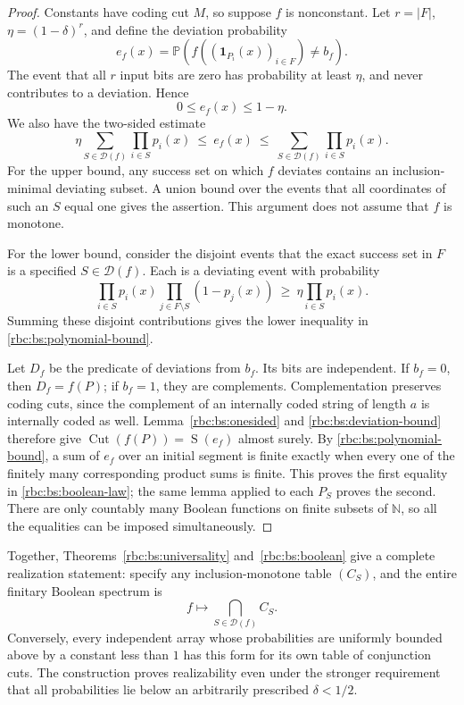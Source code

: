 \documentclass[11pt]{article}
\numberwithin{equation}{section}
\theoremstyle{definition}
\theoremstyle{remark}
\newcommand{\N}{\mathbb N}
\newcommand{\Cut}{\operatorname{Cut}}
\newcommand{\SumCut}{\operatorname{S}}
\newcommand{\Prob}{\mathbb P}
\begin{document}
\begin{proof}
Constants have coding cut $M$, so suppose $f$ is nonconstant.
Let $r=|F|$, $\eta=(1-\delta)^r$, and define the deviation probability
\[
  e_f(x)=\Prob\left(
      f((\mathbf1_{P_i}(x))_{i\in F})\ne b_f\right).
\]
The event that all $r$ input bits are zero has probability at least
$\eta$, and never contributes to a deviation.  Hence
\begin{equation}
\label{rbc:bs:deviation-bound}
  0\leq e_f(x)\leq1-\eta.
\end{equation}
We also have the two-sided estimate
\begin{equation}
\label{rbc:bs:polynomial-bound}
  \eta\sum_{S\in\mathcal D(f)}\prod_{i\in S}p_i(x)
  \ \leq\ e_f(x)\ \leq\
  \sum_{S\in\mathcal D(f)}\prod_{i\in S}p_i(x).
\end{equation}
For the upper bound, any success set on which $f$ deviates contains an
inclusion-minimal deviating subset.  A union bound over the events that
all coordinates of such an $S$ equal one gives the assertion.  This
argument does not assume that $f$ is monotone.

For the lower bound, consider the disjoint events that the exact success
set in $F$ is a specified $S\in\mathcal D(f)$.  Each is a deviating
event with probability
\[
  \prod_{i\in S}p_i(x)
  \prod_{j\in F\setminus S}(1-p_j(x))
  \ \geq\ \eta\prod_{i\in S}p_i(x).
\]
Summing these disjoint contributions gives the lower inequality in
\eqref{rbc:bs:polynomial-bound}.

Let $D_f$ be the predicate of deviations from $b_f$.  Its bits are
independent.  If $b_f=0$, then $D_f=f(P)$; if $b_f=1$, they are
complements.  Complementation preserves coding cuts, since the
complement of an internally coded string of length $a$ is internally
coded as well.  Lemma~\ref{rbc:bs:onesided} and
\eqref{rbc:bs:deviation-bound} therefore give
$\Cut(f(P))=\SumCut(e_f)$ almost surely.  By
\eqref{rbc:bs:polynomial-bound}, a sum of $e_f$ over an initial segment is
finite exactly when every one of the finitely many corresponding product
sums is finite.  This proves the first equality in
\eqref{rbc:bs:boolean-law}; the same lemma applied to each $P_S$ proves the
second.  There are only countably many Boolean functions on finite
subsets of $\N$, so all the equalities can be imposed simultaneously.
\end{proof}

Together, Theorems~\ref{rbc:bs:universality} and~\ref{rbc:bs:boolean} give a
complete realization statement: specify any inclusion-monotone table
$(C_S)$, and the entire finitary Boolean spectrum is
\begin{equation}
\label{rbc:bs:complete-spectrum}
  f\longmapsto\bigcap_{S\in\mathcal D(f)}C_S.
\end{equation}
Conversely, every independent array whose probabilities are uniformly
bounded above by a constant less than $1$ has this form for its own
table of conjunction cuts.  The construction proves realizability even
under the stronger requirement that all probabilities lie below an
arbitrarily prescribed $\delta<1/2$.
\end{document}
